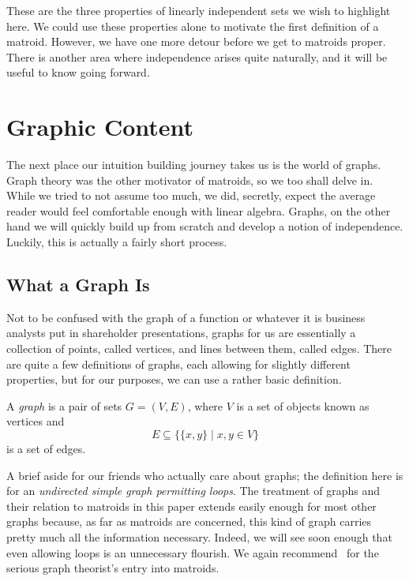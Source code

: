 \documentclass[12pt,oneside]{../../sfsuthesis}
\begin{document}
These are the three properties of linearly independent sets we wish to highlight here.
We could use these properties alone to motivate the first definition of a matroid.
However, we have one more detour before we get to matroids proper.
There is another area where independence arises quite naturally, and it will be useful to know going forward.

\section{Graphic Content}

The next place our intuition building journey takes us is the world of graphs.
Graph theory was the other motivator of matroids, so we too shall delve in.
While we tried to not assume too much, we did, secretly, expect the average reader would feel comfortable enough with linear algebra.
Graphs, on the other hand we will quickly build up from scratch and develop a notion of independence.
Luckily, this is actually a fairly short process.

\subsection{What a Graph Is}
Not to be confused with the graph of a function or whatever it is business analysts put in shareholder presentations, graphs for us are essentially a collection of points, called vertices, and lines between them, called edges.
There are quite a few definitions of graphs, each allowing for slightly different properties, but for our purposes, we can use a rather basic definition.
\begin{definition}[Graph]\label{def:graph}

    A \emph{graph} is a pair of sets \( G = (V, E) \), where \( V \) is a set of objects known as vertices and
    \[
        E \subseteq \big\{ \{x, y\} \; | \; x, y \in V \big\}
    \]
    is a set of edges.
\end{definition}
A brief aside for our friends who actually care about graphs;
the definition here is for an \emph{undirected simple graph permitting loops}.
The treatment of graphs and their relation to matroids in this paper extends easily enough for most other graphs because, as far as matroids are concerned, this kind of graph carries pretty much all the information necessary.
Indeed, we will see soon enough that even allowing loops is an unnecessary flourish.
We again recommend~\cite{oxleyMatroidTheory2011} for the serious graph theorist's entry into matroids.
\end{document}

